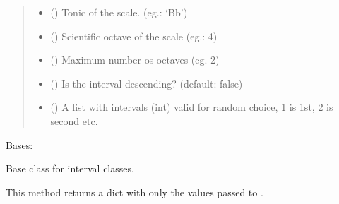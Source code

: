 \documentclass[letterpaper,10pt,english]{sphinxmanual}
\begin{document}
\begin{fulllineitems}
\begin{fulllineitems}
\begin{quote}
\begin{description}
\begin{itemize}
\item {} 
 () \textendash{} Tonic of the scale. (eg.: ‘Bb’)

\item {} 
 () \textendash{} Scientific octave of the scale (eg.: 4)

\item {} 
 () \textendash{} Maximum number os octaves (eg. 2)

\item {} 
 () \textendash{} Is the interval descending? (default: false)

\item {} 
 () \textendash{} A list with intervals (int) valid for random
choice, 1 is 1st, 2 is second etc.

\end{itemize}

\end{description}\end{quote}

\end{fulllineitems}


\end{fulllineitems}


\begin{fulllineitems}
\label{\detokenize{index:birdears.interval.IntervalBase}}
Bases: 

\begin{fulllineitems}
\label{\detokenize{index:birdears.interval.IntervalBase.__init__}}
Base class for interval classes.

\end{fulllineitems}


\begin{fulllineitems}
\label{\detokenize{index:birdears.interval.IntervalBase.return_simple}}
This method returns a dict with only the values passed to .

\end{fulllineitems}


\end{fulllineitems}
\end{document}
